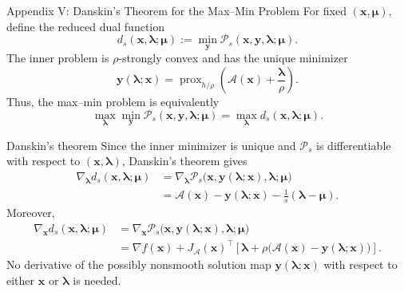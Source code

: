 \documentclass[handout,compress,9pt]{beamer}
\newcommand{\bx}{\bm{x}}
\newcommand{\by}{\bm{y}}
\newcommand{\bmu}{\bm{\mu}}
\newcommand{\blmbd}{\bm{\lambda}}
\newcommand{\calA}{\mathcal{A}}
\begin{document}
\begin{frame}{Appendix V: Danskin's Theorem for the Max--Min Problem
\hfill\hyperlink{appendix:contents}{}}
\small
For fixed $(\bx,\bmu)$, define the reduced dual function
\begin{equation*}
  d_s(\bx,\blmbd;\bmu)
  :=\min_{\by}\mathcal P_s(\bx,\by,\blmbd;\bmu).
\end{equation*}
The inner problem is $\rho$-strongly convex and has the unique minimizer
\begin{equation*}
  \by(\blmbd;\bx)
  =\operatorname{prox}_{h/\rho}
  \left(\calA(\bx)+\frac{\blmbd}{\rho}\right).
\end{equation*}
Thus, the max--min problem is equivalently
\begin{equation*}
  \max_{\blmbd}\min_{\by}\mathcal P_s(\bx,\by,\blmbd;\bmu)
  =\max_{\blmbd}d_s(\bx,\blmbd;\bmu).
\end{equation*}

\hypertarget{appendix:danskin-maxmin}{}
\begin{block}{Danskin's theorem}
Since the inner minimizer is unique and $\mathcal P_s$ is differentiable
with respect to $(\bx,\blmbd)$, Danskin's theorem gives
\begin{equation*}
  \begin{aligned}
  \nabla_{\blmbd}d_s(\bx,\blmbd;\bmu)
  &=\nabla_{\blmbd}\mathcal P_s
    \bigl(\bx,\by(\blmbd;\bx),\blmbd;\bmu\bigr) \\
  &=\calA(\bx)-\by(\blmbd;\bx)-\frac{1}{s}(\blmbd-\bmu).
  \end{aligned}
\end{equation*}
Moreover,
\begin{equation*}
  \begin{aligned}
  \nabla_{\bx}d_s(\bx,\blmbd;\bmu)
  &=\nabla_{\bx}\mathcal P_s
    \bigl(\bx,\by(\blmbd;\bx),\blmbd;\bmu\bigr) \\
  &=\nabla f(\bx)+J_{\calA}(\bx)^\top
    \left[\blmbd+\rho\bigl(\calA(\bx)-\by(\blmbd;\bx)\bigr)\right].
  \end{aligned}
\end{equation*}
No derivative of the possibly nonsmooth solution map $\by(\blmbd;\bx)$
with respect to either $\bx$ or $\blmbd$ is needed.
\end{block}
\end{frame}
\end{document}
